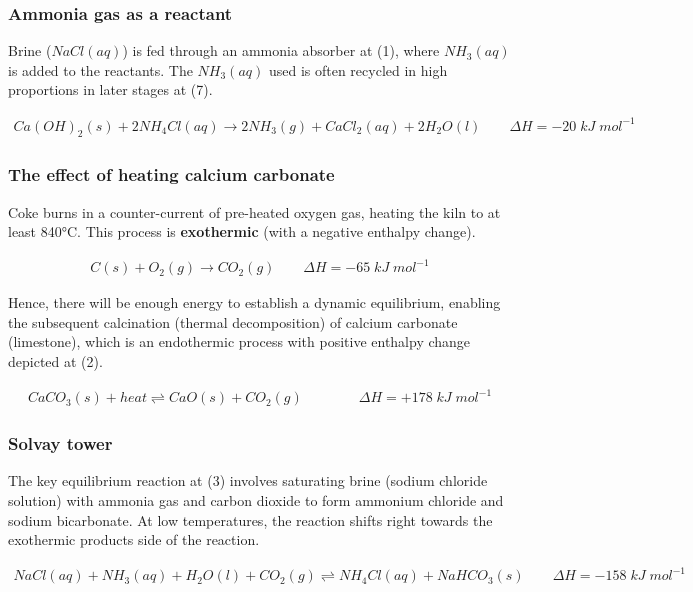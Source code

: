 \documentclass[12pt, a4paper]{article}
\begin{document}
\subsubsection{Ammonia gas as a reactant}

Brine (\(NaCl(aq)\)) is fed through an ammonia absorber at (1), where \(NH_{3}(aq)\) is added to the reactants. The \(NH_{3}(aq)\) used is often recycled in high proportions in later stages at (7).

\begin{align}
	Ca(OH)_{2}(s) + 2NH_{4}Cl(aq) \rightarrow 2NH_{3}(g) + CaCl_{2}(aq) + 2H_{2}O(l) \qquad \Delta H = -20 \; kJ \; mol^{-1}
\end{align}


\subsubsection{The effect of heating calcium carbonate}

Coke burns in a counter-current of pre-heated oxygen gas, heating the kiln to at least 840°C. This process is \textbf{exothermic} (with a negative enthalpy change).

\begin{align}
	C(s) + O_{2}(g) \rightarrow CO_{2}(g) \qquad \Delta H = -65 \; kJ \; mol^{-1}
\end{align}

Hence, there will be enough energy to establish a dynamic equilibrium, enabling the subsequent calcination (thermal decomposition) of calcium carbonate (limestone), which is an endothermic process with positive enthalpy change depicted at (2).

\begin{align}
	CaCO_{3}(s) + heat \rightleftharpoons CaO(s) + CO_{2}(g) \qquad \qquad \Delta H = +178 \; kJ \; mol^{-1}
\end{align}

\subsubsection{Solvay tower}

The key equilibrium reaction at (3) involves saturating brine (sodium chloride solution) with ammonia gas and carbon dioxide to form ammonium chloride and sodium bicarbonate. At low temperatures, the reaction shifts right towards the exothermic products side of the reaction. 

\begin{align}
	NaCl(aq) + NH_{3}(aq) + H_{2}O(l) + CO_{2}(g) \rightleftharpoons NH_{4}Cl(aq) + NaHCO_{3}(s)  \qquad \Delta H = -158 \; kJ \; mol^{-1}
\end{align}
\end{document}
